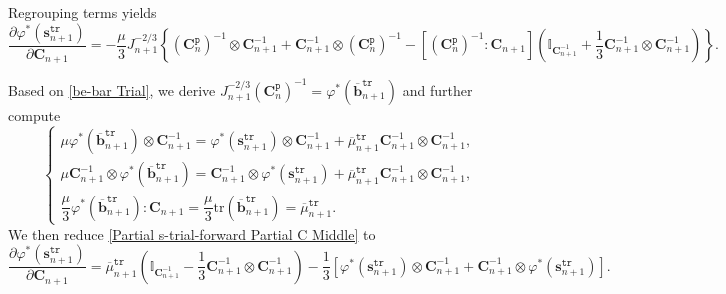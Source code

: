 \documentclass[preprint,11pt]{elsarticle}
\theoremstyle{definition}
\begin{document}
Regrouping terms yields
\begin{equation} \label{Partial s-trial-forward Partial C Middle}
    \dfrac{\partial \varphi^*(\mathbf{s}_{n+1}^\texttt{tr})}{\partial \mathbf{C}_{n+1}}
    = - \dfrac{\mu}{3} J_{n+1}^{-2/3} \left\{ \left( \mathbf{C}_n^\texttt{p} \right)^{-1} \otimes \mathbf{C}_{n+1}^{-1} + \mathbf{C}_{n+1}^{-1} \otimes \left( \mathbf{C}_n^\texttt{p} \right)^{-1}
    - \left[ \left( \mathbf{C}_n^\texttt{p} \right)^{-1} : \mathbf{C}_{n+1} \right]
    \left( \mathbb{I}_{\mathbf{C}_{n+1}^{-1}} + \dfrac{1}{3} \mathbf{C}_{n+1}^{-1} \otimes \mathbf{C}_{n+1}^{-1} \right) \right\}.
\end{equation}

Based on \eqref{be-bar Trial}, we derive $J_{n+1}^{-2/3} \left( \mathbf{C}_n^\texttt{p} \right)^{-1} = \varphi^* \left( \overline{\mathbf{b}}_{n+1}^\texttt{tr} \right)$ and further compute
\begin{equation*}
    \left\{ \begin{array}{l}
        \mu \varphi^* \left( \overline{\mathbf{b}}_{n+1}^\texttt{tr} \right) \otimes \mathbf{C}_{n+1}^{-1}
        = \varphi^* \left( \mathbf{s}_{n+1}^\texttt{tr} \right) \otimes \mathbf{C}_{n+1}^{-1}
        + \overline{\mu}_{n+1}^\texttt{tr} \mathbf{C}_{n+1}^{-1} \otimes \mathbf{C}_{n+1}^{-1}, \\[12pt]
        
        \mu \mathbf{C}_{n+1}^{-1} \otimes \varphi^* \left( \overline{\mathbf{b}}_{n+1}^\texttt{tr} \right)
        = \mathbf{C}_{n+1}^{-1} \otimes \varphi^* \left( \mathbf{s}_{n+1}^\texttt{tr} \right)
        + \overline{\mu}_{n+1}^\texttt{tr} \mathbf{C}_{n+1}^{-1} \otimes \mathbf{C}_{n+1}^{-1}, \\[12pt]
        
        \dfrac{\mu}{3} \varphi^* \left( \overline{\mathbf{b}}_{n+1}^\texttt{tr} \right) : \mathbf{C}_{n+1} = \dfrac{\mu}{3} \text{tr} \left( \overline{\mathbf{b}}_{n+1}^\texttt{tr} \right) = \overline{\mu}_{n+1}^\texttt{tr}.
    \end{array} \right.
\end{equation*}
We then reduce \eqref{Partial s-trial-forward Partial C Middle} to
\begin{equation} \label{Partial s-trial-forward Partial C Final}
    \dfrac{\partial \varphi^*(\mathbf{s}_{n+1}^\texttt{tr})}{\partial \mathbf{C}_{n+1}}
    = \overline{\mu}_{n+1}^\texttt{tr} \left( \mathbb{I}_{\mathbf{C}_{n+1}^{-1}} - \dfrac{1}{3} \mathbf{C}_{n+1}^{-1} \otimes \mathbf{C}_{n+1}^{-1} \right)
    - \dfrac{1}{3} \left[ \varphi^* \left( \mathbf{s}_{n+1}^\texttt{tr} \right) \otimes \mathbf{C}_{n+1}^{-1}
    + \mathbf{C}_{n+1}^{-1} \otimes \varphi^* \left( \mathbf{s}_{n+1}^\texttt{tr} \right) \right].
\end{equation}
\end{document}
